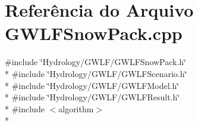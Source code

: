 \section{Referência do Arquivo G\+W\+L\+F\+Snow\+Pack.\+cpp}
\label{_g_w_l_f_snow_pack_8cpp}
{\ttfamily \#include \char`\"{}Hydrology/\+G\+W\+L\+F/\+G\+W\+L\+F\+Snow\+Pack.\+h\char`\"{}}\\*
{\ttfamily \#include \char`\"{}Hydrology/\+G\+W\+L\+F/\+G\+W\+L\+F\+Scenario.\+h\char`\"{}}\\*
{\ttfamily \#include \char`\"{}Hydrology/\+G\+W\+L\+F/\+G\+W\+L\+F\+Model.\+h\char`\"{}}\\*
{\ttfamily \#include \char`\"{}Hydrology/\+G\+W\+L\+F/\+G\+W\+L\+F\+Result.\+h\char`\"{}}\\*
{\ttfamily \#include $<$algorithm$>$}\\*
